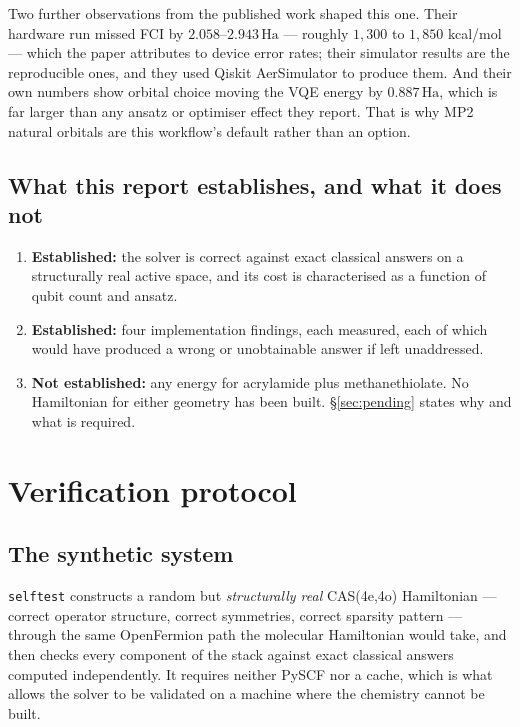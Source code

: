 \documentclass[11pt,a4paper]{article}
\newcommand{\Ha}{\ensuremath{\,\mathrm{Ha}}}
\newcommand{\code}[1]{\texttt{\small #1}}
\begin{document}
Two further observations from the published work shaped this one. Their hardware
run missed FCI by $2.058$--$2.943\Ha$ --- roughly $1{,}300$ to $1{,}850$
kcal/mol --- which the paper attributes to device error rates; their simulator
results are the reproducible ones, and they used Qiskit AerSimulator to produce
them. And their own numbers show orbital choice moving the VQE energy by
$0.887\Ha$, which is far larger than any ansatz or optimiser effect they report.
That is why MP2 natural orbitals are this workflow's default rather than an
option.

\subsection{What this report establishes, and what it does not}

\begin{enumerate}[leftmargin=1.4em,itemsep=0.15em]
\item \textbf{Established:} the solver is correct against exact classical
  answers on a structurally real active space, and its cost is characterised as
  a function of qubit count and ansatz.
\item \textbf{Established:} four implementation findings, each measured, each of
  which would have produced a wrong or unobtainable answer if left unaddressed.
\item \textbf{Not established:} any energy for acrylamide plus methanethiolate.
  No Hamiltonian for either geometry has been built. \S\ref{sec:pending}
  states why and what is required.
\end{enumerate}

\section{Verification protocol}

\subsection{The synthetic system}

\code{selftest} constructs a random but \emph{structurally real} CAS(4e,4o)
Hamiltonian --- correct operator structure, correct symmetries, correct sparsity
pattern --- through the same OpenFermion path the molecular Hamiltonian would
take, and then checks every component of the stack against exact classical
answers computed independently. It requires neither PySCF nor a cache, which is
what allows the solver to be validated on a machine where the chemistry cannot
be built.
\end{document}
